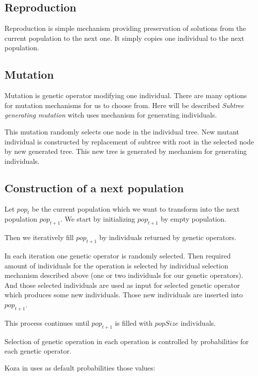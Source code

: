 \documentclass[12pt,a4paper]{report}
\begin{document}
\subsection{Reproduction}

Reproduction is simple mechanism providing preservation of solutions
from the current population to the next one. It simply copies 
one individual to the next population.

\subsection{Mutation}

Mutation is genetic operator modifying one individual.
There are many options for mutation mechanisms 
for us to choose from. Here will be described 
\textit{Subtree generating mutation} 
witch uses mechanism for generating individuals.

This mutation randomly selects one node in the individual tree.
New mutant individual is constructed by replacement of 
subtree with root in the selected node by new generated
tree. This new tree is generated by mechanism for generating 
individuals.


\subsection{Construction of a next population}

Let $pop_{t}$ be the current population which we want to 
transform into the next population $pop_{t+1}$. 
We start by initializing $pop_{t+1}$ by empty population.

Then we iteratively fill $pop_{t+1}$ by individuals 
returned by genetic operators.

In each iteration one genetic operator is randomly selected.
Then required amount of individuals for the operation is selected
by individual selection mechanism described above (one or two
individuals for our genetic operators).
And those selected individuals are used as input for selected
genetic operator which produces some new individuals.
Those new individuals are inserted into $pop_{t+1}$.

This process continues until $pop_{t+1}$ is filled with
$popSize$ individuals.  

Selection of genetic operation in each operation is 
controlled by probabilities for each genetic operator.

Koza in \cite{koza92} uses as default probabilities those values:
\end{document}
